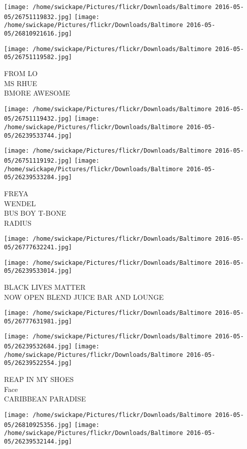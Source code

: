 \documentclass[10pt,letterpaper]{article}
\begin{document}
\texttt{[image: /home/swickape/Pictures/flickr/Downloads/Baltimore 2016-05-05/26751119832.jpg]}
\texttt{[image: /home/swickape/Pictures/flickr/Downloads/Baltimore 2016-05-05/26810921616.jpg]}

\vspace{0.25in}
\texttt{[image: /home/swickape/Pictures/flickr/Downloads/Baltimore 2016-05-05/26751119582.jpg]}

FROM LO\\
MS RHUE\\
BMORE AWESOME
\pagebreak

\texttt{[image: /home/swickape/Pictures/flickr/Downloads/Baltimore 2016-05-05/26751119432.jpg]}
\texttt{[image: /home/swickape/Pictures/flickr/Downloads/Baltimore 2016-05-05/26239533744.jpg]}

\texttt{[image: /home/swickape/Pictures/flickr/Downloads/Baltimore 2016-05-05/26751119192.jpg]}
\texttt{[image: /home/swickape/Pictures/flickr/Downloads/Baltimore 2016-05-05/26239533284.jpg]}

FREYA\\
WENDEL\\
BUS BOY T{-}BONE\\
RADIUS
\pagebreak

\texttt{[image: /home/swickape/Pictures/flickr/Downloads/Baltimore 2016-05-05/26777632241.jpg]}

\vspace{0.25in}
\texttt{[image: /home/swickape/Pictures/flickr/Downloads/Baltimore 2016-05-05/26239533014.jpg]}

BLACK LIVES MATTER\\
NOW OPEN BLEND JUICE BAR AND LOUNGE
\pagebreak

\texttt{[image: /home/swickape/Pictures/flickr/Downloads/Baltimore 2016-05-05/26777631981.jpg]}

\vspace{0.25in}
\texttt{[image: /home/swickape/Pictures/flickr/Downloads/Baltimore 2016-05-05/26239532684.jpg]}
\texttt{[image: /home/swickape/Pictures/flickr/Downloads/Baltimore 2016-05-05/26239522554.jpg]}

REAP IN MY SHOES\\
Face\\
CARIBBEAN PARADISE
\pagebreak

\texttt{[image: /home/swickape/Pictures/flickr/Downloads/Baltimore 2016-05-05/26810925356.jpg]}
\texttt{[image: /home/swickape/Pictures/flickr/Downloads/Baltimore 2016-05-05/26239532144.jpg]}
\end{document}
